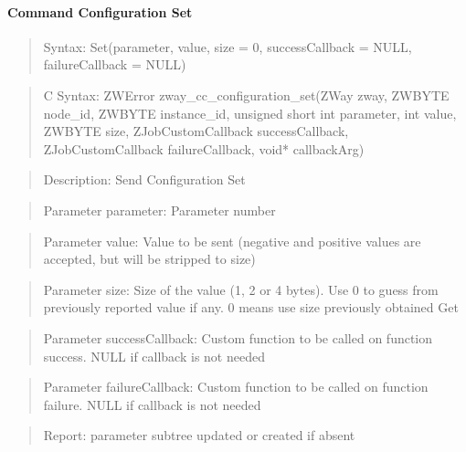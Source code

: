 \paragraph{Command Configuration Set}
\begin{quote}Syntax: Set(parameter, value, size = 0, successCallback = NULL, failureCallback = NULL)\end{quote}
\begin{quote}C Syntax: ZWError zway\_cc\_configuration\_set(ZWay zway, ZWBYTE node\_id, ZWBYTE instance\_id, unsigned short int parameter, int value, ZWBYTE size, ZJobCustomCallback successCallback, ZJobCustomCallback failureCallback, void* callbackArg)\end{quote}
\begin{quote}Description: Send Configuration Set\end{quote}
\begin{quote}Parameter parameter: Parameter number\end{quote}
\begin{quote}Parameter value: Value to be sent (negative and positive values are accepted, but will be stripped to size)\end{quote}
\begin{quote}Parameter size: Size of the value (1, 2 or 4 bytes). Use 0 to guess from previously reported value if any. 0 means use size previously obtained Get\end{quote}
\begin{quote}Parameter successCallback: Custom function to be called on function success. NULL if callback is not needed\end{quote}
\begin{quote}Parameter failureCallback: Custom function to be called on function failure. NULL if callback is not needed\end{quote}
\begin{quote}Report: parameter subtree updated or created if absent\end{quote}

